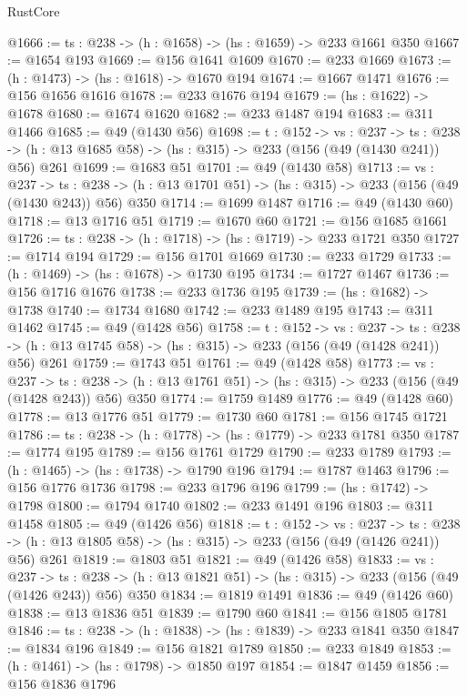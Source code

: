 \begin{lexlean}{RustCore}
\begin{coremodule}
@1666 := {ts : @238} -> (h : @1658) -> (hs : @1659) -> @233 @1661 @350
@1667 := @1654 @193
@1669 := @156 @1641 @1609
@1670 := @233 @1669
@1673 := (h : @1473) -> (hs : @1618) -> @1670 @194
@1674 := @1667 @1471
@1676 := @156 @1656 @1616
@1678 := @233 @1676 @194
@1679 := (hs : @1622) -> @1678
@1680 := @1674 @1620
@1682 := @233 @1487 @194
@1683 := @311 @1466
@1685 := @49 (@1430 @56)
@1698 := {t : @152} ->
  {vs : @237} ->
  {ts : @238} -> (h : @13 @1685 @58) -> (hs : @315) -> @233 (@156 (@49 (@1430 @241)) @56) @261
@1699 := @1683 @51
@1701 := @49 (@1430 @58)
@1713 := {vs : @237} ->
  {ts : @238} -> (h : @13 @1701 @51) -> (hs : @315) -> @233 (@156 (@49 (@1430 @243)) @56) @350
@1714 := @1699 @1487
@1716 := @49 (@1430 @60)
@1718 := @13 @1716 @51
@1719 := @1670 @60
@1721 := @156 @1685 @1661
@1726 := {ts : @238} -> (h : @1718) -> (hs : @1719) -> @233 @1721 @350
@1727 := @1714 @194
@1729 := @156 @1701 @1669
@1730 := @233 @1729
@1733 := (h : @1469) -> (hs : @1678) -> @1730 @195
@1734 := @1727 @1467
@1736 := @156 @1716 @1676
@1738 := @233 @1736 @195
@1739 := (hs : @1682) -> @1738
@1740 := @1734 @1680
@1742 := @233 @1489 @195
@1743 := @311 @1462
@1745 := @49 (@1428 @56)
@1758 := {t : @152} ->
  {vs : @237} ->
  {ts : @238} -> (h : @13 @1745 @58) -> (hs : @315) -> @233 (@156 (@49 (@1428 @241)) @56) @261
@1759 := @1743 @51
@1761 := @49 (@1428 @58)
@1773 := {vs : @237} ->
  {ts : @238} -> (h : @13 @1761 @51) -> (hs : @315) -> @233 (@156 (@49 (@1428 @243)) @56) @350
@1774 := @1759 @1489
@1776 := @49 (@1428 @60)
@1778 := @13 @1776 @51
@1779 := @1730 @60
@1781 := @156 @1745 @1721
@1786 := {ts : @238} -> (h : @1778) -> (hs : @1779) -> @233 @1781 @350
@1787 := @1774 @195
@1789 := @156 @1761 @1729
@1790 := @233 @1789
@1793 := (h : @1465) -> (hs : @1738) -> @1790 @196
@1794 := @1787 @1463
@1796 := @156 @1776 @1736
@1798 := @233 @1796 @196
@1799 := (hs : @1742) -> @1798
@1800 := @1794 @1740
@1802 := @233 @1491 @196
@1803 := @311 @1458
@1805 := @49 (@1426 @56)
@1818 := {t : @152} ->
  {vs : @237} ->
  {ts : @238} -> (h : @13 @1805 @58) -> (hs : @315) -> @233 (@156 (@49 (@1426 @241)) @56) @261
@1819 := @1803 @51
@1821 := @49 (@1426 @58)
@1833 := {vs : @237} ->
  {ts : @238} -> (h : @13 @1821 @51) -> (hs : @315) -> @233 (@156 (@49 (@1426 @243)) @56) @350
@1834 := @1819 @1491
@1836 := @49 (@1426 @60)
@1838 := @13 @1836 @51
@1839 := @1790 @60
@1841 := @156 @1805 @1781
@1846 := {ts : @238} -> (h : @1838) -> (hs : @1839) -> @233 @1841 @350
@1847 := @1834 @196
@1849 := @156 @1821 @1789
@1850 := @233 @1849
@1853 := (h : @1461) -> (hs : @1798) -> @1850 @197
@1854 := @1847 @1459
@1856 := @156 @1836 @1796

\end{coremodule}
\end{lexlean}
